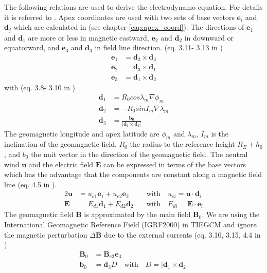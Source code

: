 The following relations are used to derive the electrodynamo equation. For
details it is referred to \cite{rich95}. Apex coordinates are used with two sets of
base vectors $\mathbf{e}_{i}$ and $\mathbf{d}_j$ which are calculated in 
 (see chapter 
\ref{cap:apex_coord}). The directions of $\mathbf{e}_{1}$ and $\mathbf{d}_1$ are
more or less in magnetic eastward, $\mathbf{e}_{2}$ and $\mathbf{d}_2$ in downward
or equatorward, and $\mathbf{e}_{3}$ and $\mathbf{d}_3$ in field line direction.
(eq. 3.11- 3.13 in \cite{rich95}) 
%
\begin{align}
   \mathbf{e}_{1} &= \mathbf{d}_2 \times \mathbf{d}_3 \\
   \mathbf{e}_{2} &= \mathbf{d}_3 \times \mathbf{d}_1 \\ 
   \mathbf{e}_{3} &= \mathbf{d}_1 \times \mathbf{d}_2 
\end{align}
%
with (eq. 3.8- 3.10 in \cite{rich95}) 
%
\begin{align}
   \mathbf{d}_{1} &= R_0 cos \lambda_m \nabla \phi_m \\
   \mathbf{d}_{2} &=-R_0 sin I_m \nabla \lambda_m  \\ 
   \mathbf{d}_{3} &= \frac{\mathbf{b_0}}{|\mathbf{d}_{1} \times \mathbf{d}_{2} |}
\end{align}
%
The geomagnetic longitude and apex latitude are $\phi_m$ and $\lambda_m$,
$I_m$ is the inclination of the geomagnetic field, $R_0$ the radius to the
reference height $R_E+ h_0$, and $b_0$ the unit vector in the direction of the
geomagnetic field.
The neutral wind $\mathbf{u}$ and the electric field $\mathbf{E}$ can be 
expressed in terms of the base vectors which has the advantage that the 
components are constant along a magnetic field line
(eq. 4.5 in \cite{rich95}).
%
\begin{alignat}{2}
   \mathbf{u} &= u_{e1} \mathbf{e}_1 + u_{e2}\mathbf{e}_2   \quad &\text{with} \quad
   {u}_{ei} = \mathbf{u} \cdot \mathbf{d}_i \\
   \mathbf{E} &= E_{d1} \mathbf{d}_1 + E_{d2}\mathbf{d}_2   \quad &\text{with} \quad
   {E}_{di} = \mathbf{E} \cdot \mathbf{e}_i
\end{alignat}
%
The geomagnetic field $\mathbf{B}$ is approximated by the main field 
$\mathbf{B}_0$. We are using the International Geomagnetic Reference Field
(IGRF2000) in TIEGCM and ignore the magnetic perturbation $\Delta \mathbf{B}$ due
to the external currents (eq. 3.10, 3.15, 4.4 in \cite{rich95}). 
%
\begin{align}
   \mathbf{B}_0 &= \mathbf{B}_{e3} \mathbf{e}_3 \\
   \mathbf{b}_0 &= \mathbf{d}_3 D \quad \text{with} \quad
             D= | \mathbf{d}_1 \times \mathbf{d}_2 |
\end{align}
